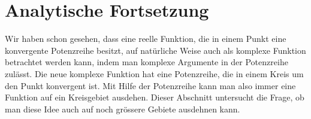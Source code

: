 %
%
%
\section{Analytische Fortsetzung
\label{buch:funktionentheorie:section:fortsetzung}}

Wir haben schon gesehen, dass eine reelle Funktion, die in einem
Punkt eine konvergente
Potenzreihe besitzt, auf natürliche Weise auch als komplexe Funktion
betrachtet werden kann, indem man komplexe Argumente in der Potenzreihe
zulässt.
Die neue komplexe Funktion hat eine Potenzreihe, die in einem Kreis um
den Punkt konvergent ist.
Mit Hilfe der Potenzreihe kann man also immer eine Funktion auf ein
Kreisgebiet ausdehen.
Dieser Abschnitt untersucht die Frage, ob man diese Idee auch auf
noch grössere Gebiete ausdehnen kann.

%
%

